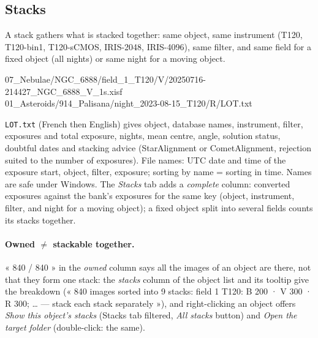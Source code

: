 \subsection{Stacks}
A stack gathers what is stacked together: same object, same instrument (T120, T120-bin1, T120-sCMOS, IRIS-2048,
IRIS-4096), same filter, and same field for a fixed object (all nights) or same night for a moving object.
\begin{ccode}
07\_Nebulae/NGC\_6888/field\_1\_T120/V/20250716-214427\_NGC\_6888\_V\_1s.xisf\\
01\_Asteroids/914\_Palisana/night\_2023-08-15\_T120/R/LOT.txt
\end{ccode}
\texttt{LOT.txt} (French then English) gives object, database names, instrument, filter, exposures and total
exposure, nights, mean centre, angle, solution status, doubtful dates and stacking advice (StarAlignment or
CometAlignment, rejection suited to the number of exposures). File names: UTC date and time of the exposure start,
object, filter, exposure; sorting by name = sorting in time. Names are safe under Windows. The \emph{Stacks} tab adds a \emph{complete} column: converted exposures against the
bank's exposures for the same key (object, instrument, filter, and night for a moving object); a fixed object split
into several fields counts its stacks together.

\paragraph{Owned $\neq$ stackable together.} « 840 / 840 » in the \emph{owned} column says all the images of an
object are there, not that they form one stack: the \emph{stacks} column of the object list and its tooltip give
the breakdown (« 840 images sorted into 9 stacks: field 1 T120: B 200 · V 300 · R 300; … — stack each stack
separately »), and right-clicking an object offers \emph{Show this object's stacks} (Stacks tab filtered,
\emph{All stacks} button) and \emph{Open the target folder} (double-click: the same).

